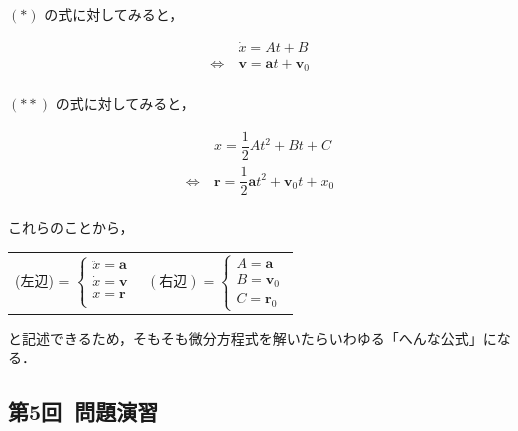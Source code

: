 \documentclass[a4paper,11pt]{ltjsarticle}
\begin{document}
$(\ast)$ の式に対してみると，

\begin{equation}
  \renewcommand{\arraystretch}{2}
  \begin{array}{rl}
    &\ \dot{x} = At + B
    \\
    \Leftrightarrow
    &\ \bm{v} = \bm{a}t + \bm{v}_{0}
    \\
  \end{array}
\end{equation}

$(\ast \ast)$ の式に対してみると，

\begin{equation}
  \renewcommand{\arraystretch}{2.5}
  \begin{array}{rl}
    &\ x = \dfrac{1}{2}At^{2} + Bt + C
    \\
    \Leftrightarrow
    &\ \bm{r} = \dfrac{1}{2}\bm{a}t^{2} + \bm{v}_{0}t + x_{0}
    \\
  \end{array}
\end{equation}

これらのことから，

\begin{table}[hb]
  \centering
  \begin{tabular}{cc}
    (左辺) =
    $
    \begin{cases}
      \ddot{x} = \bm{a} \\
      \dot{x} = \bm{v} \\
      x = \bm{r} \\
    \end{cases}
    $
    &
    $
    (右辺) =
    \begin{cases}
      A = \bm{a} \\
      B = \bm{v}_{0} \\
      C = \bm{r}_{0}
    \end{cases}
    $
  \end{tabular}
\end{table}

と記述できるため，そもそも微分方程式を解いたらいわゆる「へんな公式」になる．

\clearpage

\subsection{第5回\ 問題演習}
\end{document}
